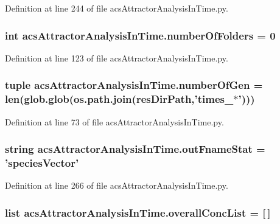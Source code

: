 Definition at line 244 of file acs\-Attractor\-Analysis\-In\-Time.\-py.

\hypertarget{a00091_a3a2fe097086bb0f4a505fca8f53dc2b0}{
\subsubsection[{number\-Of\-Folders}]{\setlength{\rightskip}{0pt plus 5cm}int acs\-Attractor\-Analysis\-In\-Time.\-number\-Of\-Folders = 0}}\label{a00091_a3a2fe097086bb0f4a505fca8f53dc2b0}


Definition at line 123 of file acs\-Attractor\-Analysis\-In\-Time.\-py.

\hypertarget{a00091_a28cc280ff54c726bd790cf781d3bab8c}{
\subsubsection[{number\-Of\-Gen}]{\setlength{\rightskip}{0pt plus 5cm}tuple acs\-Attractor\-Analysis\-In\-Time.\-number\-Of\-Gen = len(glob.\-glob(os.\-path.\-join({\bf res\-Dir\-Path},'times\-\_\-$\ast$')))}}\label{a00091_a28cc280ff54c726bd790cf781d3bab8c}


Definition at line 73 of file acs\-Attractor\-Analysis\-In\-Time.\-py.

\hypertarget{a00091_a05e902a00f3333a303563029c80605de}{
\subsubsection[{out\-Fname\-Stat}]{\setlength{\rightskip}{0pt plus 5cm}string acs\-Attractor\-Analysis\-In\-Time.\-out\-Fname\-Stat = 'species\-Vector'}}\label{a00091_a05e902a00f3333a303563029c80605de}


Definition at line 266 of file acs\-Attractor\-Analysis\-In\-Time.\-py.

\hypertarget{a00091_a2cebadd75179c46e551a2facbdd2741b}{
\subsubsection[{overall\-Conc\-List}]{\setlength{\rightskip}{0pt plus 5cm}list acs\-Attractor\-Analysis\-In\-Time.\-overall\-Conc\-List = \mbox{[}$\,$\mbox{]}}}\label{a00091_a2cebadd75179c46e551a2facbdd2741b}


